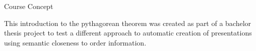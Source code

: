 \begin{omgroup}{Course Concept}
	\begin{omtext}[title=Aims]
		This introduction to the pythagorean theorem was created as part of a bachelor thesis project to test a different approach to automatic creation of presentations using semantic closeness to order information.
	\end{omtext}
\end{omgroup}
